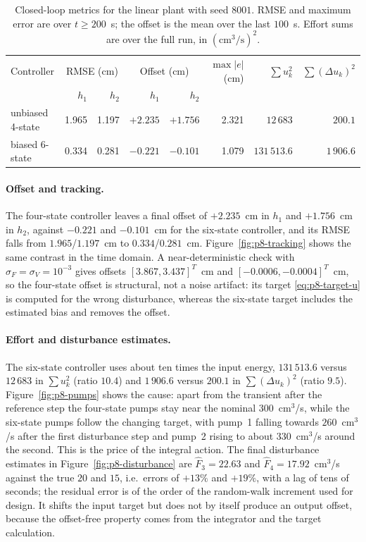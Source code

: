 \begin{table}[htbp]
 \centering
 \caption{Closed-loop metrics for the linear plant with seed $8001$.
 RMSE and maximum error are over $t\ge200$~s; the offset is the mean over
 the last $100$~s. Effort sums are over the full run, in
 $(\mathrm{cm^3/s})^2$.}
 \label{tab:p8-metrics}
 \small
 \begin{tabular}{@{}lrrrrrrr@{}}
 \hline
 Controller & \multicolumn{2}{c}{RMSE (cm)} & \multicolumn{2}{c}{Offset (cm)}
 & $\max|e|$ (cm) & $\sum u_k^2$ & $\sum(\Delta u_k)^2$\\
 & $h_1$ & $h_2$ & $h_1$ & $h_2$ & & & \\
 \hline
 unbiased 4-state & 1.965 & 1.197 & $+2.235$ & $+1.756$ & 2.321
  & $12\,683$ & $200.1$\\
 biased 6-state & 0.334 & 0.281 & $-0.221$ & $-0.101$ & 1.079
  & $131\,513.6$ & $1\,906.6$\\
 \hline
 \end{tabular}
\end{table}

\paragraph{Offset and tracking.}
The four-state controller leaves a final offset of $+2.235$~cm in $h_1$ and
$+1.756$~cm in $h_2$, against $-0.221$ and $-0.101$~cm for the six-state
controller, and its RMSE falls from $1.965$/$1.197$~cm to $0.334$/$0.281$~cm.
Figure~\ref{fig:p8-tracking} shows the same contrast in the time domain. A
near-deterministic check with $\sigma_F=\sigma_V=10^{-3}$ gives offsets
$[3.867,3.437]^T$~cm and $[-0.0006,-0.0004]^T$~cm, so the four-state offset is
structural, not a noise artifact: its target \eqref{eq:p8-target-u} is computed
for the wrong disturbance, whereas the six-state target includes the estimated
bias and removes the offset.

\paragraph{Effort and disturbance estimates.}
The six-state controller uses about ten times the input energy, $131\,513.6$
versus $12\,683$ in $\sum u_k^2$ (ratio $10.4$) and $1\,906.6$ versus $200.1$ in
$\sum(\Delta u_k)^2$ (ratio $9.5$). Figure~\ref{fig:p8-pumps} shows the cause:
apart from the transient after the reference step the four-state pumps stay near
the nominal $300$~cm$^3$/s, while the six-state pumps follow the changing target,
with pump~1 falling towards $260$~cm$^3$/s after the first disturbance step and
pump~2 rising to about $330$~cm$^3$/s around the second. This is the price of the
integral action. The final disturbance estimates in
Figure~\ref{fig:p8-disturbance} are $\hat F_3=22.63$ and
$\hat F_4=17.92$~cm$^3$/s against the true $20$ and $15$, i.e.\ errors of
$+13\%$ and $+19\%$, with a lag of tens of seconds; the residual error is of the
order of the random-walk increment used for design. It shifts the input target
but does not by itself produce an output offset, because the offset-free property
comes from the integrator and the target calculation.

